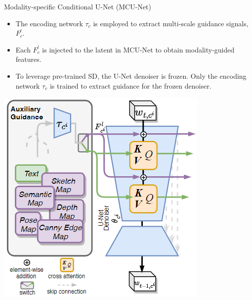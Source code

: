 \documentclass[pdf]{beamer}
\begin{document}
\begin{frame}{Modality-specific Conditional U-Net (MCU-Net)}
    \begin{minipage}{0.65\textwidth}
        \begin{itemize}
            \item The encoding network $\tau_c$ is employed to extract multi-scale guidance signals, $F_c^l$.
            \item Each $F_c^l$ is injected to the latent in MCU-Net to obtain modality-guided features.
            \item To leverage pre-trained SD, the U-Net denoiser is frozen. Only the encoding network $\tau_c$ is trained to extract guidance for the frozen denoiser.
        \end{itemize}
    \end{minipage}%
    \begin{minipage}{0.35\textwidth}
        \centering
        \includegraphics[width=\linewidth]{figures/mcu_net.png}
    \end{minipage}
\end{frame}
\end{document}

